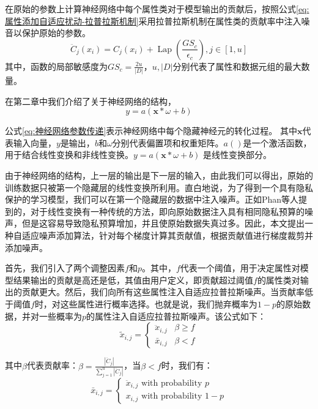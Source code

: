 在原始的参数上计算神经网络中每个属性类对于模型输出的贡献后，按照公式\ref{eq:属性添加自适应扰动-拉普拉斯机制}采用拉普拉斯机制在属性类的贡献率中注入噪音以保护原始的参数。
\begin{equation}\label{eq:属性添加自适应扰动-拉普拉斯机制}
\ddot{C}_{j}\left(x_{i}\right)=C_{j}\left(x_{i}\right)+\operatorname{Lap}\left(\frac{G S_{c}}{\epsilon_{c}}\right), j \in[1, u]
\end{equation}
其中，函数的局部敏感度为$G S_{c}=\frac{2 u}{|D|}$，$u,|D|$分别代表了属性和数据元组的最大数量。

在第二章中我们介绍了关于神经网络的结构，
\begin{equation}\label{eq:神经网络参数传递}
y=a(\mathbf{x} * \omega+b)
\end{equation}

公式\ref{eq:神经网络参数传递}表示神经网络中每个隐藏神经元的转化过程。
其中$\mathbf{x}$代表输入向量，$y$是输出，$b$和$\omega$分别代表{}偏置项和权重矩阵。$a()$是一个激活函数，用于结合线性变换和非线性变换。$y=a(\mathbf{x} * \omega+b)$ 是线性变换部分。

由于神经网络的结构，上一层的输出是下一层的输入，由此我们可以得出，原始的训练数据只被第一个隐藏层的线性变换所利用。直白地说，为了得到一个具有隐私保护的学习模型，我们可以在第一个隐藏层的数据中注入噪声。正如Phan等人提到的，对于线性变换有一种传统的方法，即向原始数据注入具有相同隐私预算的噪声，但是这容易导致隐私预算增加，并且使原始数据失真过多。因此，本文提出一种自适应噪声添加算法，针对每个梯度计算其贡献值，根据贡献值进行梯度裁剪并添加噪声。

首先，我们引入了两个调整因素$f$和$p$。其中，$f$代表一个阈值，用于决定属性对模型结果输出的贡献是高还是低，其值由用户定义，即贡献超过阈值$f$的属性类对输出的贡献更大。然后，我们向所有这些属性注入自适应拉普拉斯噪声。当贡献率低于阈值$f$时，对这些属性进行概率选择。也就是说，我们抛弃概率为$1-p$的原始数据，并对一些概率为$p$的属性注入自适应拉普拉斯噪声。该公式如下：
\begin{equation}\label{eq:神经网络加噪}
\tilde{x}_{i, j}=\left\{\begin{array}{ll}
\ddot{x}_{i, j} & \beta \geq f \\
\bar{x}_{i, j} & \beta<f
\end{array}\right.
\end{equation}

其中$\beta$代表贡献率：$\beta=\frac{\left|\ddot{C}_{j}\right|}{\sum_{j=1}^{u}\left|\ddot{C}_{j}\right|}$，当$\beta<f$时，我们有：
\begin{equation}\label{eq:神经网络加噪2}
\bar{x}_{i, j}=\left\{\begin{array}{l}
\ddot{x}_{i, j} \text { with probability } p \\
x_{i, j} \text { with probability } 1-p
\end{array}\right.
\end{equation}


